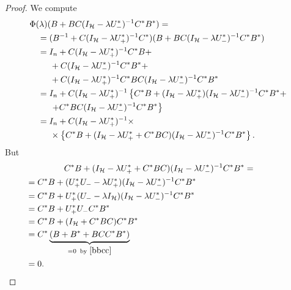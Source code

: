 \documentclass[12pt]{amsart}
\theoremstyle{definition}
\theoremstyle{remark}
\numberwithin{equation}{section}
\begin{document}
\begin{proof}
    We compute
    \[
      \begin{split}
        \Phi(\lambda)(B+BC(I_{\mathcal H}-\lambda U_-^*)^{-1}C^*B^*)&=\\
        &\hspace{-5cm}=(B^{-1}+C(I_{\mathcal H}-\lambda U_+^*)^{-1}C^*)(       B+BC(I_{\mathcal H}-\lambda U_-^*)^{-1}C^*B^*)\\
        &\hspace{-5cm}=I_n+C(I_{\mathcal H}-\lambda U_+^*)^{-1}C^*B+\\
        &\hspace{-4.5cm}+C(I_{\mathcal H}-\lambda U_-^*)^{-1}C^*B^*+\\
        &\hspace{-4.5cm}+C(I_{\mathcal H}-\lambda U_+^*)^{-1}C^*BC(I_{\mathcal H}-\lambda U_-^*)^{-1}C^*B^*\\
        &\hspace{-5cm}=I_n+C(I_{\mathcal H}-\lambda U_+^*)^{-1}\left\{C^*B+(I_{\mathcal H}-\lambda U_+^*)(I_{\mathcal H}-\lambda U_-^*)^{-1}C^*B^*+\right.\\
        &\hspace{-4.5cm}\left.+C^*BC(I_{\mathcal H}-\lambda U_-^*)^{-1}C^*B^*\right\}\\
        &\hspace{-5cm}=I_n+C(I_{\mathcal H}-\lambda U_+^*)^{-1}\times\\
        &\hspace{-4.5cm}\times\left\{C^*B+(I_{\mathcal H}-\lambda U_+^*+C^*BC)(I_{\mathcal H}-\lambda U_-^*)^{-1}C^*B^*\right\}.
            \end{split}
          \]
          But
          \[
            \begin{split}
             C^*B+ (I_{\mathcal H}-\lambda U_+^*+C^*BC)(I_{\mathcal H}-\lambda U_-^*)^{-1}C^*B^*&=\\
              &\hspace{-9cm}       =C^*B+      (U_+^*U_--\lambda U_+^*)(I_{\mathcal H}-\lambda U_-^*)^{-1}C^*B^*\\
              &\hspace{-9cm}=C^*B+       U_+^*(U_--\lambda I_{\mathcal H})(I_{\mathcal H}-\lambda U_-^*)^{-1}C^*B^*\\
              &\hspace{-9cm}=C^*B+    U_+^*U_-C^*B^*\\
              &\hspace{-9cm}=C^*B+      (I_{\mathcal H}+C^*BC)C^*B^*\\
              &\hspace{-9cm}=C^*\underbrace{\left(B+B^* +BCC^*B^*\right)}_{=0\,\,\,{\rm by}\,\, \eqref{bbcc}}\\
              &\hspace{-9cm}=0.
            \end{split}
            \]




\end{proof}
\end{document}
